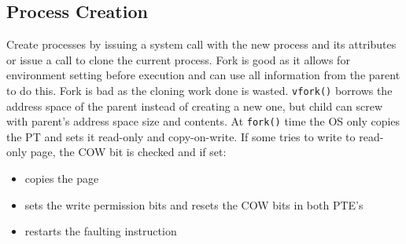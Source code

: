 \documentclass[twoside]{article}
\begin{document}
\subsection{Process Creation}
Create processes by issuing a system call with the new process and its attributes or issue a call to clone the current process. Fork is good as it allows for environment setting before execution and can use all information from the parent to do this. Fork is bad as the cloning work done is wasted. \texttt{vfork()} borrows the address space of the parent instead of creating a new one, but child can screw with parent's address space size and contents. At \texttt{fork()} time the OS only copies the PT and sets it read-only and copy-on-write. If some tries to write to read-only page, the COW bit is checked and if set:
\begin{itemize}
\item copies the page
\item sets the write permission bits and resets the COW bits in both PTE's
\item restarts the faulting instruction
\end{itemize}
\end{document}
